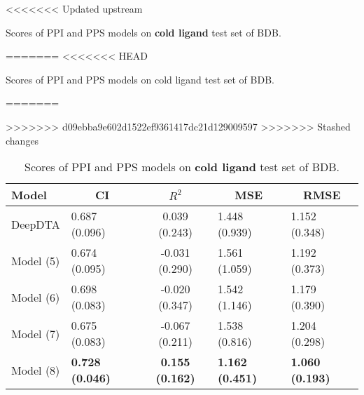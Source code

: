 \begin{table}
\centering
<<<<<<< Updated upstream
\caption{Scores of PPI and PPS models on \textbf{cold ligand} test set of BDB.}
\label{tab:ddi_ci_r2}
=======
<<<<<<< HEAD
\caption{Scores of PPI and PPS models on cold ligand test set of BDB.}
\vspace{0.25em}
=======
\caption{Scores of PPI and PPS models on \textbf{cold ligand} test set of BDB.}
\label{tab:ddi_ci_r2}
>>>>>>> d09ebba9e602d1522ef9361417dc21d129009597
>>>>>>> Stashed changes
\begin{tabular}{|l|l|c|l|l|} 
\hline
Model & \multicolumn{1}{c|}{CI} & $R^2$ & \multicolumn{1}{c|}{MSE} & \multicolumn{1}{c|}{RMSE} \\ 
\hline
DeepDTA & 0.687 (0.096) & 0.039 (0.243) & 1.448 (0.939) & 1.152 (0.348) \\ 
\hline
Model (5) & 0.674 (0.095) & -0.031 (0.290) & 1.561 (1.059) & 1.192 (0.373) \\ 
\hline
Model (6) & 0.698 (0.083) & -0.020 (0.347) & 1.542 (1.146) & 1.179 (0.390) \\ 
\hline
Model (7) & 0.675 (0.083) & -0.067 (0.211) & 1.538 (0.816) & 1.204 (0.298) \\ 
\hline
Model (8) & \textbf{0.728 (0.046)} & \textbf{0.155 (0.162)} & \textbf{1.162 (0.451)} & \textbf{1.060 (0.193)} \\
\hline
\end{tabular}
\label{tab:ppi_vs_pps_cold_ligand}
\end{table}